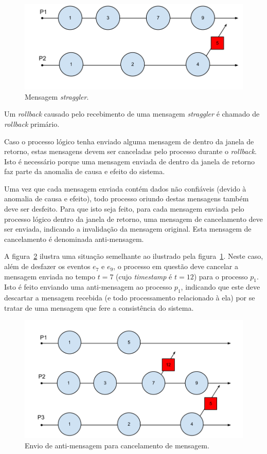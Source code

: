 \begin{figure}
  \centerline{\includegraphics[scale=0.4]{straggler_2.png}}
  \caption{Mensagem \textit{straggler}.}
\label{fig:strag_2}
\end{figure}

Um \textit{rollback} causado pelo recebimento de uma mensagem \textit{straggler} é chamado de \textit{rollback} primário.

Caso o processo lógico tenha enviado alguma mensagem de dentro da janela de retorno, estas mensagens devem ser canceladas pelo processo durante o \textit{rollback}. Isto é necessário porque uma mensagem enviada de dentro da janela de retorno faz parte da anomalia de causa e efeito do sistema.

Uma vez que cada mensagem enviada contém dados não confiáveis (devido à anomalia de causa e efeito), todo processo oriundo destas mensagens também deve ser desfeito. Para que isto seja feito, para cada mensagem enviada pelo processo lógico dentro da janela de retorno, uma mensagem de cancelamento deve ser enviada, indicando a invalidação da mensagem original. Esta mensagem de cancelamento é denominada anti-mensagem.

A figura~\ref{fig:strag_3} ilustra uma situação semelhante ao ilustrado pela figura~\ref{fig:strag_2}. Neste caso, além de desfazer os eventos $e_{7}$ e $e_{9}$, o processo em questão deve cancelar a mensagem enviada no tempo $t=7$ (cujo \textit{timestamp} é $t=12$) para o processo $p_{1}$. Isto é feito enviando uma anti-mensagem ao processo $p_{1}$, indicando que este deve descartar a mensagem recebida (e todo processamento relacionado à ela) por se tratar de uma mensagem que fere a consistência do sistema.

\begin{figure}
  \centerline{\includegraphics[scale=0.4]{straggler_3.png}}
  \caption{Envio de anti-mensagem para cancelamento de mensagem.}
\label{fig:strag_3}
\end{figure}


